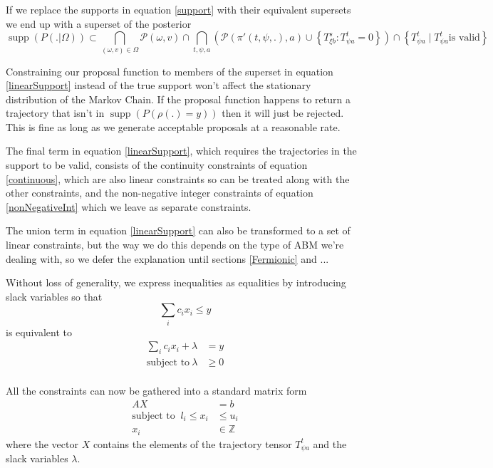\documentclass{article}
\DeclareMathOperator\supp{supp}
\begin{document}
If we replace the supports in equation \ref{support} with their equivalent supersets we end up with a superset of the posterior
\begin{equation}
\supp(P(.|\Omega)) \subset
\bigcap_{(\omega,v) \in \Omega}  \mathcal{P}(\omega, v) \cap
\bigcap_{t, \psi, a} \left( \mathcal{P}(\pi'(t,\psi,.), a) \cup \left\{T^s_{\xi b}: T^t_{\psi a} = 0\right\} \right)\cap
\left\{T^t_{\psi a} \mid T^t_{\psi a} \text{is valid}\right\}
\label{linearSupport}
\end{equation}

Constraining our proposal function to members of the superset in equation \ref{linearSupport} instead of the true support won't affect the stationary distribution of the Markov Chain. If the proposal function happens to return a trajectory that isn't in $\supp(P(\rho(.)=y))$ then it will just be rejected. This is fine as long as we generate acceptable proposals at a reasonable rate.

The final term in equation \ref{linearSupport}, which requires the trajectories in the support to be valid, consists of the continuity constraints of equation \ref{continuous}, which are also linear constraints so can be treated along with the other constraints, and the non-negative integer constraints of equation \ref{nonNegativeInt} which we leave as separate constraints.

The union term in equation \ref{linearSupport} can also be transformed to a set of linear constraints, but the way we do this depends on the type of ABM we're dealing with, so we defer the explanation until sections \ref{Fermionic} and ...

Without loss of generality, we express inequalities as equalities by introducing slack variables so that
\[
\sum_i c_i x_i \le y
\]
is equivalent to
\[
\begin{split}
\sum_i c_i x_i + \lambda & = y \\
\text{subject to}\ \lambda & \ge 0 \\
\end{split}
\]

All the constraints can now be gathered into a standard matrix form
\begin{equation}
\begin{split}
AX &= b \\
\text{subject to }\ l_i \le x_i &\le u_i\\
x_i &\in \mathbb{Z}
\end{split}
\label{Axy}
\end{equation}
where the vector $X$ contains the elements of the trajectory tensor $T^t_{\psi a}$ and the slack variables $\lambda$.
\end{document}
